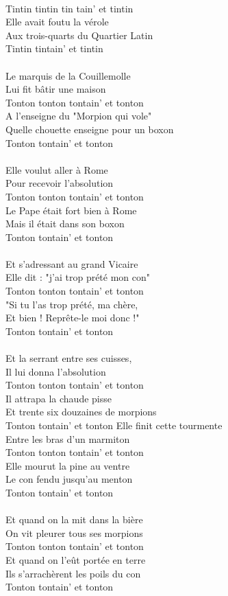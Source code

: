 \\Tintin tintin tin tain' et tintin
\\Elle avait foutu la vérole
\\Aux trois-quarts du Quartier Latin
\\Tintin tintain' et tintin
\\\\Le marquis de la Couillemolle
\\Lui fit bâtir une maison
\\Tonton tonton tontain' et tonton
\\A l'enseigne du "Morpion qui vole"
\\Quelle chouette enseigne pour un boxon
\\Tonton tontain' et tonton
\\\\Elle voulut aller à Rome
\\Pour recevoir l'absolution
\\Tonton tonton tontain' et tonton
\\Le Pape était fort bien à Rome
\\Mais il était dans son boxon
\\Tonton tontain' et tonton
\\\\Et s'adressant au grand Vicaire
\\Elle dit : "j'ai trop prété mon con"
\\Tonton tonton tontain' et tonton
\\"Si tu l'as trop prété, ma chère,
\\Et bien ! Reprête-le moi donc !"
\\Tonton tontain' et tonton
\\\\Et la serrant entre ses cuisses,
\\Il lui donna l'absolution
\\Tonton tonton tontain' et tonton
\\Il attrapa la chaude pisse
\\Et trente six douzaines de morpions
\\Tonton tontain' et tonton
\breakpage
Elle finit cette tourmente
\\Entre les bras d'un marmiton
\\Tonton tonton tontain' et tonton
\\Elle mourut la pine au ventre
\\Le con fendu jusqu'au menton
\\Tonton tontain' et tonton
\\\\Et quand on la mit dans la bière
\\On vit pleurer tous ses morpions
\\Tonton tonton tontain' et tonton
\\Et quand on l'eût portée en terre
\\Ils s'arrachèrent les poils du con
\\Tonton tontain' et tonton
\\

